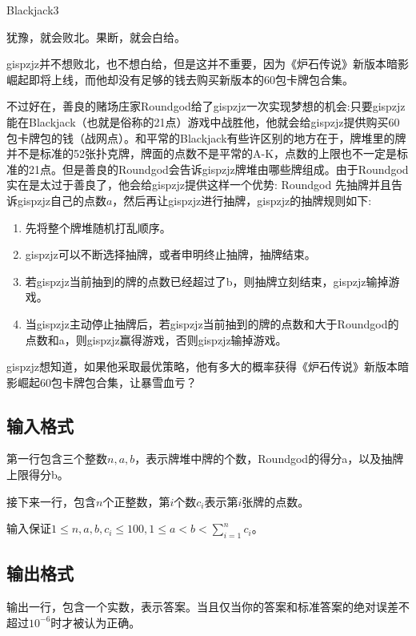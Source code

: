 \begin{Problem}{Blackjack}{3}

犹豫，就会败北。果断，就会白给。

gispzjz并不想败北，也不想白给，但是这并不重要，因为《炉石传说》新版本暗影崛起即将上线，而他却没有足够的钱去购买新版本的60包卡牌包合集。

不过好在，善良的赌场庄家Roundgod给了gispzjz一次实现梦想的机会:只要gispzjz能在Blackjack（也就是俗称的21点）游戏中战胜他，他就会给gispzjz提供购买60包卡牌包的钱（战网点）。和平常的Blackjack有些许区别的地方在于，牌堆里的牌并不是标准的52张扑克牌，牌面的点数不是平常的A-K，点数的上限也不一定是标准的21点。但是善良的Roundgod会告诉gispzjz牌堆由哪些牌组成。由于Roundgod实在是太过于善良了，他会给gispzjz提供这样一个优势: Roundgod 先抽牌并且告诉gispzjz自己的点数$a$，然后再让gispzjz进行抽牌，gispzjz的抽牌规则如下:

\begin{enumerate}
\item 先将整个牌堆随机打乱顺序。
\item gispzjz可以不断选择抽牌，或者申明终止抽牌，抽牌结束。
\item 若gispzjz当前抽到的牌的点数已经超过了b，则抽牌立刻结束，gispzjz输掉游戏。
\item 当gispzjz主动停止抽牌后，若gispzjz当前抽到的牌的点数和大于Roundgod的点数和a，则gispzjz赢得游戏，否则gispzjz输掉游戏。
\end{enumerate}

gispzjz想知道，如果他采取最优策略，他有多大的概率获得《炉石传说》新版本暗影崛起60包卡牌包合集，让暴雪血亏？

\subsection*{输入格式}

第一行包含三个整数$n,a,b$，表示牌堆中牌的个数，Roundgod的得分a，以及抽牌上限得分b。

接下来一行，包含$n$个正整数，第$i$个数$c_i$表示第$i$张牌的点数。

输入保证$1 \leq n,a,b,c_i \leq 100, 1 \leq a < b < \sum_{i=1}^n c_i$。

\subsection*{输出格式}

输出一行，包含一个实数，表示答案。当且仅当你的答案和标准答案的绝对误差不超过$10^{-6}$时才被认为正确。


\end{Problem}
